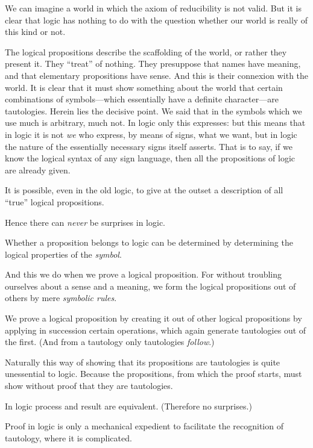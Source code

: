 {We can imagine a world in which the axiom of
reducibility is not valid. But it is clear that logic
has nothing to do with the question whether our
world is really of this kind or not.}


{The logical propositions describe the scaffolding
of the world, or rather they present it. They
``treat'' of nothing. They presuppose that names
have meaning, and that elementary propositions
have sense. And this is their connexion with the
world. It is clear that it must show something
about the world that certain combinations of symbols---which
essentially have a definite character---are
tautologies. Herein lies the decisive point. We
said that in the symbols which we use much is
arbitrary, much not. In logic only this expresses:
but this means that in logic it is not \emph{we} who express,
by means of signs, what we want, but in logic the
nature of the essentially necessary signs itself
asserts. That is to say, if we know the logical
syntax of any sign language, then all the propositions
of logic are already given.}


{It is possible, even in the old logic, to give
at the outset a description of all ``true'' logical
propositions.}


{Hence there can \emph{never} be surprises in logic.}


{Whether a proposition belongs to logic can be
determined by determining the logical properties
of the \emph{symbol}.

And this we do when we prove a logical proposition.
For without troubling ourselves about
a sense and a meaning, we form the logical
propositions out of others by mere \emph{symbolic
rules}.

We prove a logical proposition by creating it
out of other logical propositions by applying in
succession certain operations, which again generate
tautologies out of the first. (And from a tautology
only tautologies \emph{follow}.)

Naturally this way of showing that its propositions
are tautologies is quite unessential to
logic. Because the propositions, from which the
proof starts, must show without proof that they
are tautologies.}


{In logic process and result are equivalent.
(Therefore no surprises.)}


{Proof in logic is only a mechanical expedient
to facilitate the recognition of tautology, where
it is complicated.}


